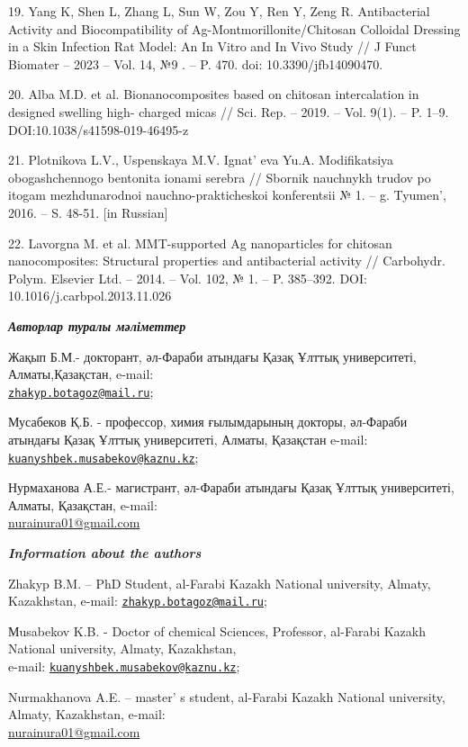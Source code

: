\begin{references}
19. Yang K, Shen L, Zhang L, Sun W, Zou Y, Ren Y, Zeng R. Antibacterial
Activity and Biocompatibility of Ag-Montmorillonite/Chitosan Colloidal
Dressing in a Skin Infection Rat Model: An In Vitro and In Vivo Study
// J Funct Biomater -- 2023 -- Vol. 14, №9 . -- P. 470. doi:
10.3390/jfb14090470.

20. Alba M.D. et al. Bionanocomposites based on chitosan intercalation in
designed swelling high- charged micas // Sci. Rep. -- 2019. -- Vol.
9(1). -- P. 1--9. DOI:10.1038/s41598-019-46495-z

21. Plotnikova L.V., Uspenskaya M.V. Ignat' eva Yu.A.
Modifikatsiya obogashchennogo bentonita ionami serebra // Sbornik
nauchnykh trudov po itogam mezhdunarodnoi nauchno-prakticheskoi
konferentsii № 1. -- g. Tyumen', 2016. -- S. 48-51.
{[}in Russian{]}

22. Lavorgna M. et al. MMT-supported Ag nanoparticles for chitosan
nanocomposites: Structural properties and antibacterial activity //
Carbohydr. Polym. Elsevier Ltd. -- 2014. -- Vol. 102, № 1. -- P.
385--392. DOI: 10.1016/j.carbpol.2013.11.026
\end{references}

\begin{authorinfo}
\hspace{1em}\emph{{\bfseries Авторлар туралы мәліметтер}}

Жақып Б.М.- докторант, әл-Фараби атындағы Қазақ Ұлттық университеті,
Алматы,Қазақстан, e-mail:
\\\href{mailto:zhakyp.botagoz@mail.ru}{\nolinkurl{zhakyp.botagoz@mail.ru}};

Мусабеков Қ.Б. - профессор, химия ғылымдарының докторы, әл-Фараби
атындағы Қазақ Ұлттық университеті, Алматы, Қазақстан e-mail:
\href{mailto:kuanyshbek.musabekov@kaznu.kz}{\nolinkurl{kuanyshbek.musabekov@kaznu.kz}};

Нурмаханова А.Е.- магистрант, әл-Фараби атындағы Қазақ Ұлттық
университеті, Алматы, Қазақстан, e-mail:
\\\href{mailto:zhakyp.botagoz@mail.ru}{nurainura01@gmail.com}

\hspace{1em}\emph{{\bfseries Information about the authors}}

Zhakyp B.M. -- PhD Student, al-Farabi Kazakh National university,
Almaty, Kazakhstan, e-mail:
\href{mailto:zhakyp.botagoz@mail.ru}{\nolinkurl{zhakyp.botagoz@mail.ru}};

Мusabekov K.B. - Doctor of chemical Sciences, Professor, al-Farabi
Kazakh National university, Almaty, Kazakhstan, \\e-mail:
\href{mailto:kuanyshbek.musabekov@kaznu.kz}{\nolinkurl{kuanyshbek.musabekov@kaznu.kz}};

Nurmakhanova A.E. -- master' s student, al-Farabi Kazakh
National university, Almaty, Kazakhstan, e-mail:
\\\href{mailto:zhakyp.botagoz@mail.ru}{nurainura01@gmail.com}
\end{authorinfo}
